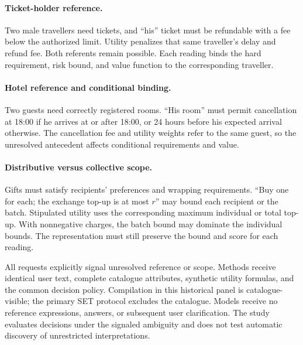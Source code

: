 \documentclass[11pt]{article}
\begin{document}
\paragraph{Ticket-holder reference.}
Two male travellers need tickets, and ``his'' ticket must be refundable with a fee below the authorized limit. Utility penalizes that same traveller's delay and refund fee. Both referents remain possible. Each reading binds the hard requirement, risk bound, and value function to the corresponding traveller.

\paragraph{Hotel reference and conditional binding.}
Two guests need correctly registered rooms. ``His room'' must permit cancellation at 18:00 if he arrives at or after 18:00, or 24 hours before his expected arrival otherwise. The cancellation fee and utility weights refer to the same guest, so the unresolved antecedent affects conditional requirements and value.

\paragraph{Distributive versus collective scope.}
Gifts must satisfy recipients' preferences and wrapping requirements. ``Buy one for each; the exchange top-up is at most $r$'' may bound each recipient or the batch. Stipulated utility uses the corresponding maximum individual or total top-up. With nonnegative charges, the batch bound may dominate the individual bounds. The representation must still preserve the bound and score for each reading.

All requests explicitly signal unresolved reference or scope. Methods receive identical user text, complete catalogue attributes, synthetic utility formulas, and the common decision policy. Compilation in this historical panel is catalogue-visible; the primary SET protocol excludes the catalogue. Models receive no reference expressions, answers, or subsequent user clarification. The study evaluates decisions under the signaled ambiguity and does not test automatic discovery of unrestricted interpretations.
\end{document}
